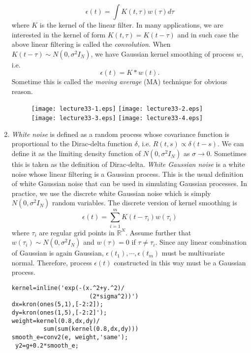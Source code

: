 \documentclass[11pt,twocolumn]{article} %
\begin{document}
\begin{enumerate}
$$ \epsilon(t) = \int K(t,\tau)w(\tau)  d\tau$$
where $K$ is the kernel of the linear filter. In many
applications, we are interested in the kernel of form $K(t,\tau) =
K(t-\tau)$ and in such case the above linear filtering is called
the {\em convolution}. When $K(t-\tau) \sim N(0,\sigma^2I_N)$, we
have Gaussian kernel smoothing of process $w$, i.e.
$$\epsilon(t) = K * w (t).$$
Sometime this is called the {\em moving average} (MA) technique
for obvious reason.
\begin{figure}
\centering
\renewcommand{\baselinestretch}{1}
\texttt{[image: lecture33-1.eps]}
\texttt{[image: lecture33-2.eps]}
\texttt{[image: lecture33-3.eps]}
\texttt{[image: lecture33-4.eps]}
\end{figure}
\item {\em White noise} is defined as a random process whose
covariance function is proportional to the Dirac-delta function
$\delta$, i.e. $R(t,s) \propto \delta(t-s)$. We can define it as
the limiting density function of $N(0,\sigma^2I_N)$ as $\sigma \to
0$. %
Sometimes this is taken as the definition of
Dirac-delta. {\em White Gaussian noise} is a white noise whose
linear filtering is a Gaussian process. This is the usual
definition of white Gaussian noise that can be used in simulating
Gaussian processes. In practice, we use the discrete white
Gaussian noise which is simply $N(0,\sigma^2I_N)$ random
variables. The discrete version of kernel smoothing is
$$\epsilon(t) = \sum_{i=1}^m K(t-\tau_i)w(\tau_i)$$
where $\tau_i$ are regular grid points in $\mathbb{R}^N$. Assume
further that $w(\tau_i) \sim N(0,\sigma^2I_N)$ and $w(\tau)=0$ if
$\tau \neq \tau_i$. Since any linear combination of Gaussian is
again Gaussian, $\epsilon(t_1), \cdots, \epsilon(t_m)$ must be
multivariate normal. Therefore, process $\epsilon(t)$ constructed
in this way must be a Gaussian process.
\begin{verbatim}
kernel=inline('exp(-(x.^2+y.^2)/
                      (2*sigma^2))')
dx=kron(ones(5,1),[-2:2]);
dy=kron(ones(1,5),[-2:2]');
weight=kernel(0.8,dx,dy)/
         sum(sum(kernel(0.8,dx,dy)))
smooth_e=conv2(e, weight,'same');
 y2=g+0.2*smooth_e;
\end{verbatim}
\end{enumerate}
\end{document}
